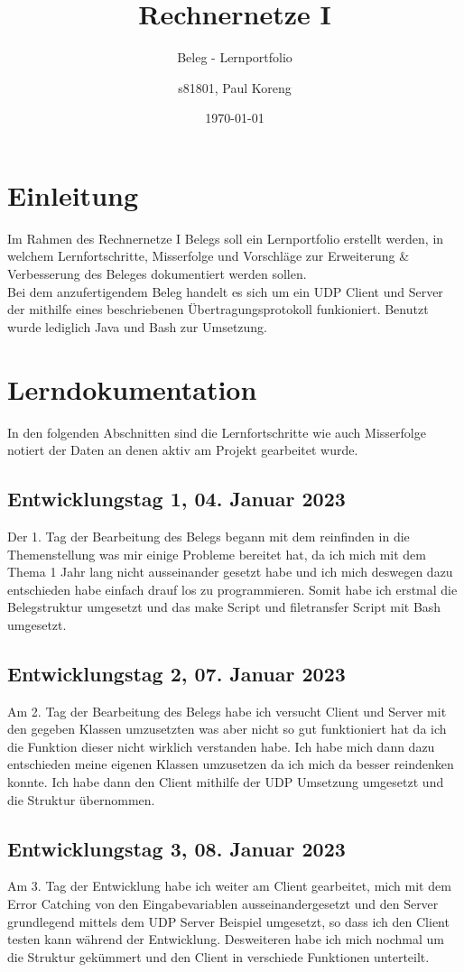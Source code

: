 \documentclass[a4paper,12pt,titlepage]{scrartcl}
\title{Rechnernetze I}
\subtitle{Beleg - Lernportfolio}
\author{s81801, Paul Koreng}
\date{\today}
\begin{document}
    {
        \centering
        \maketitle
    }
    \newpage
    \tableofcontents
    \newpage
    \section{Einleitung}
        Im Rahmen des Rechnernetze I Belegs soll ein Lernportfolio erstellt werden, in welchem Lernfortschritte, Misserfolge und Vorschläge zur Erweiterung \& Verbesserung des Beleges dokumentiert werden sollen.\\
        Bei dem anzufertigendem Beleg handelt es sich um ein UDP Client und Server der mithilfe eines beschriebenen Übertragungsprotokoll funkioniert. Benutzt wurde lediglich Java und Bash zur Umsetzung.
    \newpage
    \section{Lerndokumentation}
        In den folgenden Abschnitten sind die Lernfortschritte wie auch Misserfolge notiert der Daten an denen aktiv am Projekt gearbeitet wurde.
        \subsection{Entwicklungstag 1, 04. Januar 2023}
            Der 1. Tag der Bearbeitung des Belegs begann mit dem reinfinden in die Themenstellung was mir einige Probleme bereitet hat, da ich mich mit dem Thema 1 Jahr lang nicht ausseinander gesetzt habe und ich mich deswegen dazu entschieden habe einfach drauf los zu programmieren. Somit habe ich erstmal die Belegstruktur umgesetzt und das make Script und filetransfer Script mit Bash umgesetzt.
        \subsection{Entwicklungstag 2, 07. Januar 2023}
            Am 2. Tag der Bearbeitung des Belegs habe ich versucht Client und Server mit den gegeben Klassen umzusetzten was aber nicht so gut funktioniert hat da ich die Funktion dieser nicht wirklich verstanden habe. Ich habe mich dann dazu entschieden meine eigenen Klassen umzusetzen da ich mich da besser reindenken konnte. Ich habe dann den Client mithilfe der UDP Umsetzung umgesetzt und die Struktur übernommen.
        \subsection{Entwicklungstag 3, 08. Januar 2023}
            Am 3. Tag der Entwicklung habe ich weiter am Client gearbeitet, mich mit dem Error Catching von den Eingabevariablen ausseinandergesetzt und den Server grundlegend mittels dem UDP Server Beispiel umgesetzt, so dass ich den Client testen kann während der Entwicklung. Desweiteren habe ich mich nochmal um die Struktur gekümmert und den Client in verschiede Funktionen unterteilt.
\end{document}
